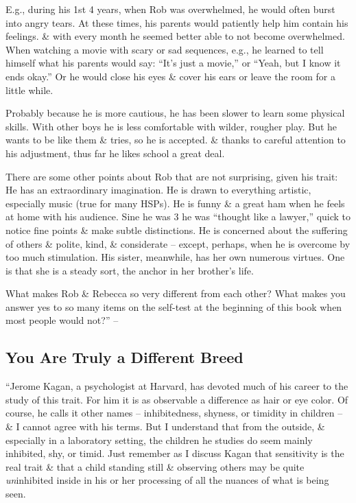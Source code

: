 \documentclass{article}
\numberwithin{equation}{section}
\begin{document}
E.g., during his 1st 4 years, when Rob was overwhelmed, he would often burst into angry tears. At these times, his parents would patiently help him contain his feelings. \& with every month he seemed better able to not become overwhelmed. When watching a movie with scary or sad sequences, e.g., he learned to tell himself what his parents would say: ``It's just a movie,'' or ``Yeah, but I know it ends okay.'' Or he would close his eyes \& cover his ears or leave the room for a little while.

Probably because he is more cautious, he has been slower to learn some physical skills. With other boys he is less comfortable with wilder, rougher play. But he wants to be like them \& tries, so he is accepted. \& thanks to careful attention to his adjustment, thus far he likes school a great deal.

There are some other points about Rob that are not surprising, given his trait: He has an extraordinary imagination. He is drawn to everything artistic, especially music (true for many HSPs). He is funny \& a great ham when he feels at home with his audience. Sine he was 3 he was ``thought like a lawyer,'' quick to notice fine points \& make subtle distinctions. He is concerned about the suffering of others \& polite, kind, \& considerate -- except, perhaps, when he is overcome by too much stimulation. His sister, meanwhile, has her own numerous virtues. One is that she is a steady sort, the anchor in her brother's life.

What makes Rob \& Rebecca so very different from each other? What makes you answer yes to so many items on the self-test at the beginning of this book when most people would not?'' -- \cite[pp. 59--61]{Aron2013}

\subsection{You Are Truly a Different Breed}
``Jerome Kagan, a psychologist at Harvard, has devoted much of his career to the study of this trait. For him it is as observable a difference as hair or eye color. Of course, he calls it other names -- inhibitedness, shyness, or timidity in children -- \& I cannot agree with his terms. But I understand that from the outside, \& especially in a laboratory setting, the children he studies do seem mainly inhibited, shy, or timid. Just remember as I discuss Kagan that sensitivity is the real trait \& that a child standing still \& observing others may be quite \textit{un}inhibited inside in his or her processing of all the nuances of what is being seen.
\end{document}
